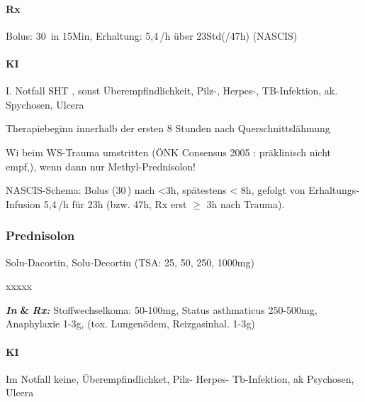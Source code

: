 \paragraph{Rx} Bolus: 30\, in 15Min, Erhaltung: 5,4\,/h über 23Std(/47h)
(NASCIS)

\paragraph{KI} I. Notfall SHT%
, sonst Überempfindlichkeit, Pilz-, Herpes-, TB-Infektion, ak.
Spychosen, Ulcera

Therapiebeginn innerhalb der ersten 8 Stunden nach Querschnittslähmung


Wi beim WS-Trauma umstritten (ÖNK Consensus 2005%
: präklinisch nicht empf,), wenn dann nur Methyl-Prednisolon! 

NASCIS-Schema: Bolus (30\,) nach {\textless}3h, spätestens
{\textless} 8h, gefolgt von Erhaltungs-Infusion 5,4\,/h für
23h (bzw. 47h, Rx erst ${\geq}$ 3h nach Trauma).


\bigskip

\subsubsection{Prednisolon}

Solu-Dacortin, Solu-Decortin (TSA: 25, 50, 250, 1000mg)
\begin{labeling}[~]{xxxxx}
  \item[Beschreibung:]
  \item[I:]
  \item[KI:]
  \item[Präparate:]
\end{labeling}
{\color[rgb]{0.5019608,0.0,0.5019608}
\textbf{\textit{\textcolor[rgb]{0.0,0.5019608,0.0}{In}}}\textbf{ \&
}\textbf{\textit{Rx:
}}\textcolor[rgb]{0.0,0.5019608,0.0}{Stoffwechselkoma:} 50-100mg,
\textcolor[rgb]{0.0,0.5019608,0.0}{Status asthmaticus} 250-500mg,
\textcolor[rgb]{0.0,0.5019608,0.0}{Anaphylaxie} 1-3g, (tox.
\textcolor[rgb]{0.0,0.5019608,0.0}{Lungenödem, Reizgasinhal.} 1-3g) }

\paragraph{KI} Im Notfall keine, Überempfindlichket, Pilz- Herpes- Tb-Infektion,
ak Psychosen, Ulcera

